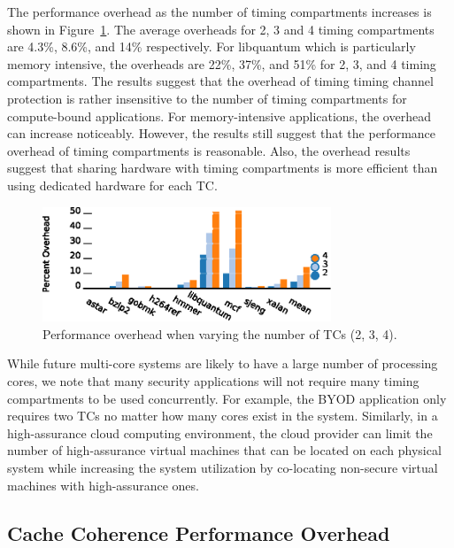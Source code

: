 The performance overhead as the number of timing compartments increases is 
shown in Figure~\ref{fig:scalability}. The average overheads %
for 2, 3 and 4 timing compartments are 4.3\%, 8.6\%, and 14\% 
respectively. For libquantum which is particularly memory intensive, the 
overheads are 22\%, 37\%, and 51\% for 2, 3, and 4 timing compartments. The 
results suggest that the overhead of timing timing channel protection is rather 
insensitive to the number of timing compartments for compute-bound 
applications. For memory-intensive applications, the overhead can increase 
noticeably. However, the results still suggest that the performance overhead
of timing compartments is reasonable. Also, the overhead results suggest
that sharing hardware with timing compartments is more efficient than
using dedicated hardware for each TC.

\begin{figure}
    \begin{center}
        \includegraphics[width=3.4in]{figs/scalability.eps}
        \caption{Performance overhead when varying the number of TCs (2, 3, 4).}
        \label{fig:scalability}
		\vspace{-0.2in}
    \end{center}
\end{figure}

While future multi-core systems are likely to have a large number of processing 
cores, we note that many security applications will not require many timing 
compartments to be used concurrently. For example, the BYOD application only 
requires two TCs no matter how many cores exist in the system. Similarly, in a 
high-assurance cloud computing environment, the cloud provider can limit the
number of high-assurance virtual machines that can be located on each physical
system while increasing the system utilization by co-locating non-secure
virtual machines with high-assurance ones.

\subsection{Cache Coherence Performance Overhead}


